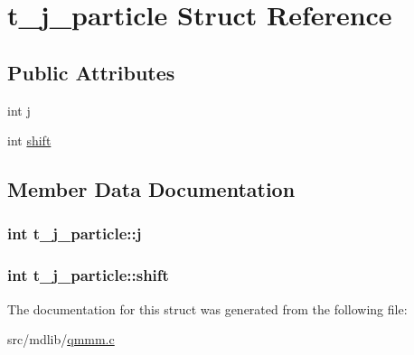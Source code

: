 \hypertarget{structt__j__particle}{\section{t\-\_\-j\-\_\-particle \-Struct \-Reference}
\label{structt__j__particle}
}
\subsection*{\-Public \-Attributes}
\begin{DoxyCompactItemize}
\item 
int \hyperlink{structt__j__particle_a7ad93eabe2c0df9b8efe4e26a328b734}{j}
\item 
int \hyperlink{structt__j__particle_a9e89d77bdd45786bfcf84c537bd5aa1e}{shift}
\end{DoxyCompactItemize}


\subsection{\-Member \-Data \-Documentation}
\hypertarget{structt__j__particle_a7ad93eabe2c0df9b8efe4e26a328b734}{
\subsubsection[{j}]{\setlength{\rightskip}{0pt plus 5cm}int {\bf t\-\_\-j\-\_\-particle\-::j}}}\label{structt__j__particle_a7ad93eabe2c0df9b8efe4e26a328b734}
\hypertarget{structt__j__particle_a9e89d77bdd45786bfcf84c537bd5aa1e}{
\subsubsection[{shift}]{\setlength{\rightskip}{0pt plus 5cm}int {\bf t\-\_\-j\-\_\-particle\-::shift}}}\label{structt__j__particle_a9e89d77bdd45786bfcf84c537bd5aa1e}


\-The documentation for this struct was generated from the following file\-:\begin{DoxyCompactItemize}
\item 
src/mdlib/\hyperlink{qmmm_8c}{qmmm.\-c}\end{DoxyCompactItemize}
